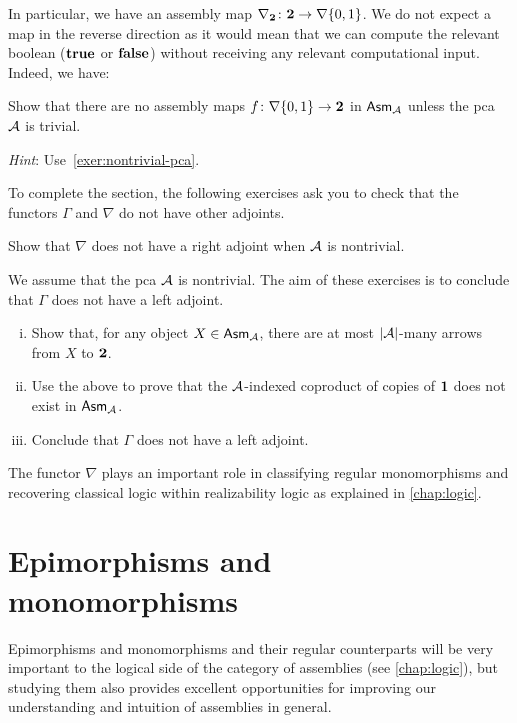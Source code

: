 In particular, we have an assembly map
\(\nabla_\Two \colon \Two \to \nabla\set{0,1}\).
%
We do not expect a map in the reverse direction as it would mean that we can
compute the relevant boolean (\(\pcatrue\) or \(\pcafalse\)) without receiving
any relevant computational input. Indeed, we have:

\begin{exercise}\label{exer:no-nabla-to-Two}
  Show that there are no assembly maps \(f \colon \nabla\set{0,1} \to \Two\) in
  \(\Asm{\AA}\) unless the pca \(\AA\) is trivial.

  \emph{Hint}: Use~\cref{exer:nontrivial-pca}.
\end{exercise}

To complete the section, the following exercises ask you to check that the
functors \(\Gamma\) and \(\nabla\) do not have other adjoints.

\begin{exercise}\label{exer:nabla-no-right-adjoint}
  Show that \(\nabla\) does not have a right adjoint when \(\AA\) is nontrivial.

\end{exercise}

\begin{exercise}\label{exer:Gamma-no-left-adjoint}
  We assume that the pca \(\AA\) is nontrivial. The aim of these exercises is to
  conclude that \(\Gamma\) does not have a left adjoint.
  \begin{enumerate}[(i)]
  \item Show that, for any object \(X \in \Asm{\AA}\), there are at most
    \(\carrier{\AA}\)-many arrows from \(X\) to \(\Two\).
  \item Use the above to prove that the \(\AA\)-indexed coproduct of copies of
    \(\One\) does not exist in \(\Asm{\AA}\).
  \item Conclude that \(\Gamma\) does not have a left adjoint.
  \end{enumerate}
\end{exercise}

The functor \(\nabla\) plays an important role in classifying regular
monomorphisms and recovering classical logic within realizability logic as
explained in \cref{chap:logic}.

\section{Epimorphisms and monomorphisms}
Epimorphisms and monomorphisms and their regular counterparts will be very
important to the logical side of the category of assemblies (see
\cref{chap:logic}), but studying them also provides excellent opportunities
for improving our understanding and intuition of assemblies in general.

